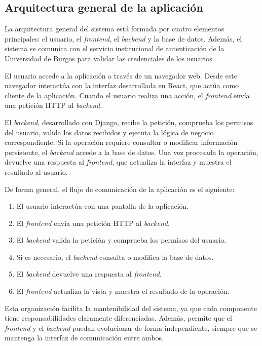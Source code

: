 \subsection{Arquitectura general de la aplicación}

La arquitectura general del sistema está formada por cuatro elementos principales: el usuario, el \textit{frontend}, el \textit{backend} y la base de datos. Además, el sistema se comunica con el servicio institucional de autenticación de la Universidad de Burgos para validar las credenciales de los usuarios.

El usuario accede a la aplicación a través de un navegador web. Desde este navegador interactúa con la interfaz desarrollada en React, que actúa como cliente de la aplicación. Cuando el usuario realiza una acción, el \textit{frontend} envía una petición HTTP al \textit{backend}.

El \textit{backend}, desarrollado con Django, recibe la petición, comprueba los permisos del usuario, valida los datos recibidos y ejecuta la lógica de negocio correspondiente. Si la operación requiere consultar o modificar información persistente, el \textit{backend} accede a la base de datos. Una vez procesada la operación, devuelve una respuesta al \textit{frontend}, que actualiza la interfaz y muestra el resultado al usuario.

De forma general, el flujo de comunicación de la aplicación es el siguiente:

\begin{enumerate}
	\item El usuario interactúa con una pantalla de la aplicación.
	\item El \textit{frontend} envía una petición HTTP al \textit{backend}.
	\item El \textit{backend} valida la petición y comprueba los permisos del usuario.
	\item Si es necesario, el \textit{backend} consulta o modifica la base de datos.
	\item El \textit{backend} devuelve una respuesta al \textit{frontend}.
	\item El \textit{frontend} actualiza la vista y muestra el resultado de la operación.
\end{enumerate}

Esta organización facilita la mantenibilidad del sistema, ya que cada componente tiene responsabilidades claramente diferenciadas. Además, permite que el \textit{frontend} y el \textit{backend} puedan evolucionar de forma independiente, siempre que se mantenga la interfaz de comunicación entre ambos.

